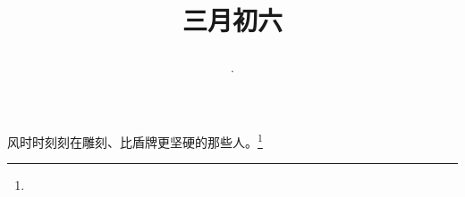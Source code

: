 \title{\date[d=14,m=4,y=2024][year:cn-y,年,month:cn,day:cn,日,·,weekday]·三月初六 }
风时时刻刻在雕刻、比盾牌更坚硬的那些人。\footnote{ }

